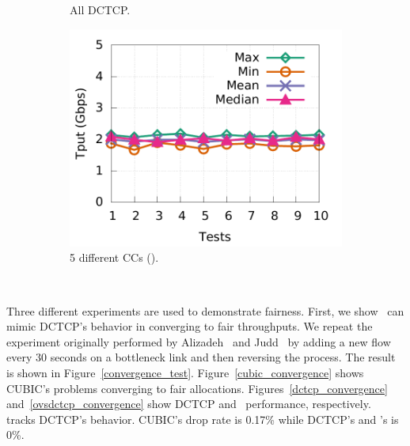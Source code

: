 \begin{figure}[!t]
\begin{subfigure}[b]{0.45\textwidth}
                \caption{All DCTCP.}
                \label{fairness_5CC_with_dctcp}
        \end{subfigure}
        \begin{subfigure}[b]{0.45\textwidth}
                \centering
                \includegraphics[width=\textwidth]{acdctcp/figures/tput_fairness/liquid_5CC_tput.pdf}
                \caption{5 different CCs (\acdc{}).}
                \label{fairness_5CC_with_ours}
        \end{subfigure}
	\caption{~} 
 	\label{tput_fairness_coexistence}
\end{figure}	


Three different experiments are used to demonstrate fairness. First, we show~\acdc{} can mimic DCTCP's 
behavior in converging to fair throughputs. We repeat the experiment originally performed 
by Alizadeh~\cite{alizadeh2011data} and Judd~\cite{judd2015nsdi} by 
adding a new flow every 30 seconds on a bottleneck link and then reversing the process. 
The result is shown in Figure~\ref{convergence_test}.
Figure~\ref{cubic_convergence} shows CUBIC's problems converging to fair allocations.
Figures~\ref{dctcp_convergence}
and~\ref{ovsdctcp_convergence} show DCTCP and~\acdc{} performance, respectively.~\acdc{} tracks DCTCP's behavior.
CUBIC's drop rate is 0.17\% while DCTCP's and \acdc{}'s is 0\%. 


